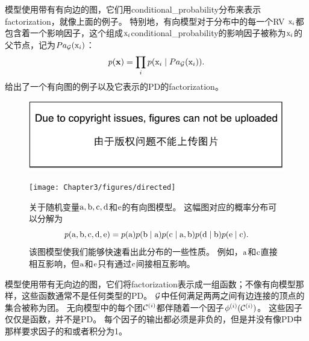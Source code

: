 模型使用带有有向边的图，它们用\gls{conditional_probability}分布来表示\gls{factorization}，就像上面的例子。
特别地，有向模型对于分布中的每一个\gls{RV} $\mathrm{x}_i$都包含着一个影响因子，这个组成$\mathrm{x}_i$\gls{conditional_probability}的影响因子被称为$\mathrm{x}_i$的父节点，记为$Pa_{\mathcal{G}}(\mathrm{x}_i)$：
\begin{equation}
p(\mathbf{x}) = \prod_i p(\mathrm{x}_i \mid Pa_{\mathcal{G}}(\mathrm{x}_i)).
\end{equation}
给出了一个有向图的例子以及它表示的\gls{PD}的\gls{factorization}。
\begin{figure}[!htb]
\ifOpenSource
\centerline{\includegraphics{figure.pdf}}
\else
\centerline{\texttt{[image: Chapter3/figures/directed]}}
\fi
\captionsetup{singlelinecheck=off}
\caption[.]{关于随机变量$\mathrm{a}, \mathrm{b}, \mathrm{c}, \mathrm{d}$和$\mathrm{e}$的有向图模型。
这幅图对应的概率分布可以分解为
\begin{equation}
p(\mathrm{a}, \mathrm{b}, \mathrm{c}, \mathrm{d}, \mathrm{e}) = p(\mathrm{a}) p(\mathrm{b} \mid \mathrm{a}) p(\mathrm{c} \mid \mathrm{a}, \mathrm{b}) p(\mathrm{d} \mid \mathrm{b}) p(\mathrm{e} \mid \mathrm{c}).
\end{equation}
该图模型使我们能够快速看出此分布的一些性质。
例如，$\mathrm{a}$和$\mathrm{c}$直接相互影响，但$\mathrm{a}$和$\mathrm{e}$只有通过$\mathrm{c}$间接相互影响。}
\label{fig:chap3_directed}
\end{figure}



模型使用带有无向边的图，它们将\gls{factorization}表示成一组函数；不像有向模型那样，这些函数通常不是任何类型的\gls{PD}。
$\mathcal{G}$中任何满足两两之间有边连接的顶点的集合被称为团。
无向模型中的每个团$\mathcal{C}^{(i)}$都伴随着一个因子$\phi^{(i)}(\mathcal{C}^{(i)})$。
 这些因子仅仅是函数，并不是\gls{PD}。
 每个因子的输出都必须是非负的，但是并没有像\gls{PD}中那样要求因子的和或者积分为1。

